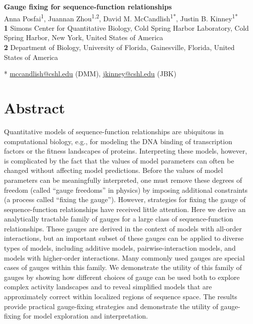\documentclass[10pt,letterpaper]{article}
\begin{document}
\vspace*{0.2in}

\begin{flushleft}
{\Large
\textbf{Gauge fixing for sequence-function relationships}
}
\newline
\\
Anna Posfai\textsuperscript{1},
Juannan Zhou\textsuperscript{1,2},
David M. McCandlish\textsuperscript{1*},
Justin B. Kinney\textsuperscript{1*}
\\
\bigskip
\textbf{1} 
Simons Center for Quantitative Biology, Cold Spring Harbor Laboratory, Cold Spring Harbor, New York, United States of America
\\
\textbf{2} Department of Biology, University of Florida, Gainesville, Florida, United States of America
\\
\bigskip

* \href{mailto:mccandlish@cshl.edu}{mccandlish@cshl.edu} (DMM), \href{mailto:jkinney@cshl.edu}{jkinney@cshl.edu} (JBK)

\end{flushleft}

\section*{Abstract}
Quantitative models of sequence-function relationships are ubiquitous in computational biology, e.g., for modeling the DNA binding of transcription factors or the fitness landscapes of proteins. Interpreting these models, however, is complicated by the fact that the values of model parameters can often be changed without affecting model predictions. Before the values of model parameters can be meaningfully interpreted, one must remove these degrees of freedom (called ``gauge freedoms'' in physics) by imposing additional constraints (a process called ``fixing the gauge''). However, strategies for fixing the gauge of sequence-function relationships have received little attention. Here we derive an analytically tractable family of gauges for a large class of sequence-function relationships. These gauges are derived in the context of models with all-order interactions, but an important subset of these gauges can be applied to diverse types of models, including additive models, pairwise-interaction models, and models with higher-order interactions. Many commonly used gauges are special cases of gauges within this family. We demonstrate the utility of this family of gauges by showing how different choices of gauge can be used both to explore complex activity landscapes and to reveal simplified models that are approximately correct within localized regions of sequence space. The results provide practical gauge-fixing strategies and demonstrate the utility of gauge-fixing for model exploration and interpretation. 
\end{document}
